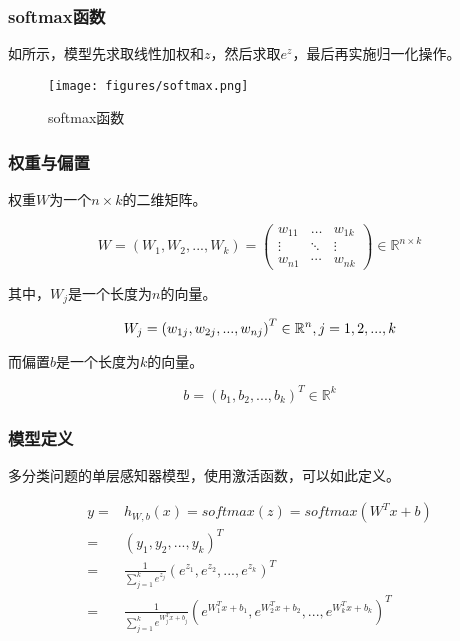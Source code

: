 \begin{content}
\begin{content}
\subsubsection{softmax函数}

如所示，模型先求取线性加权和$z$，然后求取$e^z$，最后再实施归一化操作。

\begin{figure}[H]
\centering
\texttt{[image: figures/softmax.png]}
\caption{softmax函数}
 \label{fig:softmax}
\end{figure}

\subsubsection{权重与偏置}

权重$W$为一个$n \times k$的二维矩阵。

\[
W = \left( {{W_1},{W_2},...,{W_k}} \right) = \left( {\begin{array}{*{20}{c}}
  {{w_{11}}}& \ldots &{{w_{1k}}} \\ 
   \vdots & \ddots & \vdots  \\ 
  {{w_{n1}}}& \cdots &{{w_{nk}}} 
\end{array}} \right) \in {\mathbb{R}^{n \times k}}
\]

其中，$W_j$是一个长度为$n$的向量。

\[
{W_j} = {\left( {{w_{1j}},{w_{2j}},...,{w_{nj}}} \right)^T} \in {\mathbb{R}^n}, j = 1,2,...,k \\
\]

而偏置$b$是一个长度为$k$的向量。

\[
b = {({b_1},{b_2},...,{b_k})^T} \in {\mathbb{R}^k}
\]

\subsubsection{模型定义}

多分类问题的单层感知器模型，使用激活函数，可以如此定义。

\[\begin{aligned}
  y =  & {h_{W,b}}(x) = softmax (z) = softmax ({W^T}x + b) \\ 
   =  & {\left( {{y_1},{y_2},...,{y_k}} \right)^T} \\ 
   =  & \frac{1}{{\sum\limits_{j = 1}^k {{e^{{z_j}}}} }}{\left( {{e^{{z_1}}},{e^{{z_2}}},...,{e^{{z_k}}}} \right)^T} \\ 
   =  & \frac{1}{{\sum\limits_{j = 1}^k {{e^{W_j^Tx + {b_j}}}} }}{\left( {{e^{W_1^Tx + {b_1}}},{e^{W_2^Tx + {b_2}}},...,{e^{W_k^Tx + {b_k}}}} \right)^T} \ 
\end{aligned} \]


\end{content}
\end{content}
